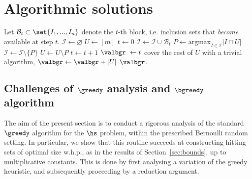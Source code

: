 \section{Algorithmic solutions}\label{sec:algo_sol}

\begin{algorithm}[!t]
    \caption{\bgreedy}\label{alg:block_greedy}
    \begin{algorithmic}[1]
    \State Let \(\mathcal{B}_t \subset \set{I_1,...,I_n}\) denote the \(t\)-th block, i.e. inclusion sets that {\it become} available at step \(t\).
    \State \(\mathcal{I} \gets \varnothing\)
    \State $U \gets [m]$
    \State $t \gets 0$
        \State \(\mathcal{I} \gets \mathcal{I} \cup \mathcal{B}_t\) \label{step:adding_new_block} 
        \State \(P \gets \mathrm{argmax}_{I \in \mathcal{I}}\bigl|I \cap U\bigr| \)  \label{step:greedy_step} 
        \State \(\mathcal{I} \gets \mathcal{I} \setminus \{P\}\)
        \State \(U \gets U \setminus P\)
        \State \(t \gets t + 1\)
    \EndWhile
    \State \(\valbgr\ \gets t\)
     \quad cover the rest of \(U\) with a trivial algorithm, \(\valbgr \gets \valbgr + |U|\)
    \EndIf
    \State \Return \(\valbgr\).
    \end{algorithmic}
    \end{algorithm}

\subsection{Challenges of \(\greedy\) analysis and \(\bgreedy\) algorithm}
The aim of the present section is to conduct a rigorous analysis of the standard $\greedy$ algorithm for the \(\hs\) problem, within the prescribed Bernoulli random setting. 
In particular, we show that this routine succeeds at constructing hitting sets of optimal size w.h.p., as in the results of Section~\ref{sec:bounds}, up to multiplicative constants. 
This is done by first analysing a variation of the greedy heuristic, and subsequently proceeding by a reduction argument.\\
\noindent

